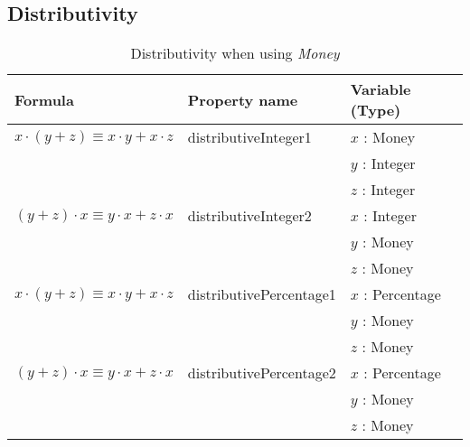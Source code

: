 \subsection*{Distributivity}
\label{ssct:properties_distributivity}
\begin{table}[!ht]
\centering
\begin{tabular}{lll}
\hline
                        \textbf{Formula}                               & \textbf{Property name}  & \textbf{Variable (Type)} \\ \hline
\rowcolor[HTML]{EFEFEF} $x \cdot (y + z) \equiv x \cdot y + x \cdot z$ & distributiveInteger1    & $x$ : Money              \\
\rowcolor[HTML]{EFEFEF}                                                &                         & $y$ : Integer            \\
\rowcolor[HTML]{EFEFEF}                                                &                         & $z$ : Integer            \\
                        $(y + z) \cdot x \equiv y \cdot x + z \cdot x$ & distributiveInteger2    & $x$ : Integer            \\
                                                                       &                         & $y$ : Money              \\
                                                                       &                         & $z$ : Money              \\
\rowcolor[HTML]{EFEFEF} $x \cdot (y + z) \equiv x \cdot y + x \cdot z$ & distributivePercentage1 & $x$ : Percentage         \\
\rowcolor[HTML]{EFEFEF}                                                &                         & $y$ : Money              \\
\rowcolor[HTML]{EFEFEF}                                                &                         & $z$ : Money              \\
                        $(y + z) \cdot x \equiv y \cdot x + z \cdot x$ & distributivePercentage2 & $x$ : Percentage         \\
                                                                       &                         & $y$ : Money              \\
                                                                       &                         & $z$ : Money              \\ \hline
\end{tabular}
\caption{Distributivity when using \textit{Money}}
\label{tbl:ch4_money_distributivity}
\end{table}
